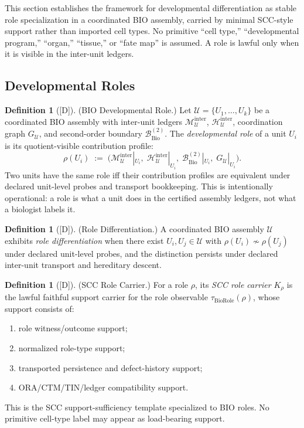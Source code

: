 \documentclass[12pt,oneside]{amsbook}
\theoremstyle{plain}
\theoremstyle{definition}
\newtheorem{definition}[theorem]{Definition}
\theoremstyle{remark}
\newcommand{\status}[1]{\textup{[#1]}}
\begin{document}
This section establishes the framework for developmental differentiation
as stable role specialization in a coordinated BIO assembly, carried
by minimal SCC-style support rather than imported cell types. No
primitive ``cell type,'' ``developmental program,'' ``organ,''
``tissue,'' or ``fate map'' is assumed. A role is lawful only when
it is visible in the inter-unit ledgers.

\subsection{Developmental Roles}\label{sec:bio-DEV-roles}

\begin{definition}[\status{D}]\label{def:bio-developmental-role}
\textup{(BIO Developmental Role.)}
Let $\mathcal{U} = \{U_1,\ldots,U_k\}$ be a coordinated BIO assembly
with inter-unit ledgers
$\mathcal{M}_{\mathcal{U}}^{\mathrm{inter}}$,
$\mathcal{H}_{\mathcal{U}}^{\mathrm{inter}}$,
coordination graph $G_{\mathcal{U}}$, and second-order boundary
$\mathcal{B}_{\mathrm{Bio}}^{(2)}$.
The \emph{developmental role} of a unit $U_i$ is its
quotient-visible contribution profile:
\[
 \rho(U_i) \;:=\;
 \bigl(
 \mathcal{M}_{\mathcal{U}}^{\mathrm{inter}}|_{U_i},\;
 \mathcal{H}_{\mathcal{U}}^{\mathrm{inter}}|_{U_i},\;
 \mathcal{B}_{\mathrm{Bio}}^{(2)}|_{U_i},\;
 G_{\mathcal{U}}|_{U_i}
 \bigr).
\]
Two units have the same role iff their contribution profiles are
equivalent under declared unit-level probes and transport bookkeeping.
This is intentionally operational: a role is what a unit does in
the certified assembly ledgers, not what a biologist labels it.
\end{definition}

\begin{definition}[\status{D}]\label{def:bio-role-differentiation}
\textup{(Role Differentiation.)}
A coordinated BIO assembly $\mathcal{U}$ exhibits \emph{role
differentiation} when there exist $U_i, U_j \in \mathcal{U}$ with
$\rho(U_i) \not\sim \rho(U_j)$ under declared unit-level probes, and
the distinction persists under declared inter-unit transport and
hereditary descent.
\end{definition}

\begin{definition}[\status{D}]\label{def:bio-scc-role-carrier}
\textup{(SCC Role Carrier.)}
For a role $\rho$, its \emph{SCC role carrier} $K_\rho$ is the
lawful faithful support carrier for the role observable $\tau_{\mathrm{BioRole}}(\rho)$,
whose support consists of:
\begin{enumerate}[label=\textup{(\arabic*)}]
 \item role witness/outcome support;
 \item normalized role-type support;
 \item transported persistence and defect-history support;
 \item ORA/CTM/TIN/ledger compatibility support.
\end{enumerate}
This is the SCC support-sufficiency template specialized to BIO roles.
No primitive cell-type label may appear as load-bearing support.
\end{definition}
\end{document}
